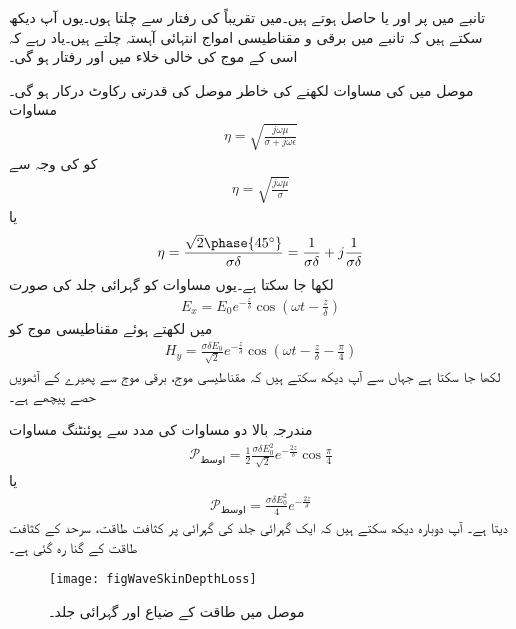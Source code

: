 تانبے میں  پر  اور  یا  حاصل ہوتے ہیں۔میں تقریباً  کی رفتار سے چلتا ہوں۔یوں آپ دیکھ سکتے ہیں کہ تانبے میں برقی و مقناطیسی امواج انتہائی آہستہ چلتے ہیں۔یاد رہے کہ اسی  کے موج کی خالی خلاء میں  اور  رفتار  ہو گی۔

موصل میں  کی مساوات لکھنے کی خاطر موصل کی قدرتی رکاوٹ درکار ہو گی۔مساوات 
\begin{align*}
\eta =\sqrt{\frac{j \omega \mu}{\sigma +j \omega \epsilon}}
\end{align*}
کو  کی وجہ سے
\begin{align*}
\eta=\sqrt{\frac{j\omega\mu}{\sigma}}
\end{align*}
یا
\begin{align}\label{مساوات_موج_قدرتی_رکاوٹ_موصل_گہرائی_جلد_کے_ساتھ}
\eta=\frac{\sqrt{2}\phase{45^\circ}}{\sigma \delta}=\frac{1}{\sigma \delta}+j\frac{1}{\sigma \delta}
\end{align}
لکھا جا سکتا ہے۔یوں مساوات  کو گہرائی جلد کی صورت
\begin{align}
E_x=E_0 e^{-\frac{z}{\delta}} \cos \left(\omega t -\frac{z}{\delta}\right)
\end{align}
 میں لکھتے ہوئے مقناطیسی موج کو
\begin{align}
H_y=\frac{\sigma \delta E_0}{\sqrt{2}} e^{-\frac{z}{\delta}} \cos \left(\omega t-\frac{z}{\delta}-\frac{\pi}{4}\right)
\end{align}
لکھا جا سکتا ہے جہاں سے آپ دیکھ سکتے ہیں کہ مقناطیسی موج، برقی موج سے  پھیرے کے آٹھویں حصے پیچھے ہے۔

مندرجہ بالا دو مساوات کی مدد سے پوئنٹنگ مساوات
 \begin{align*}
\mathscr{P}_{\text{اوسط}}=\frac{1}{2} \frac{\sigma \delta E_0^2}{\sqrt{2}} e^{-\frac{2 z}{\delta}} \cos \frac{\pi}{4}
\end{align*}
یا
\begin{align*}
\mathscr{P}_{\text{اوسط}}=\frac{\sigma \delta E_0^2}{4} e^{-\frac{2 z}{\delta}}
\end{align*}
دیتا ہے۔ آپ دوبارہ دیکھ سکتے ہیں کہ ایک گہرائی جلد کی گہرائی پر کثافت طاقت، سرحد کے کثافت طاقت کے  گنا رہ گئی ہے۔

\begin{figure}
\centering
\texttt{[image: figWaveSkinDepthLoss]}
\caption{موصل میں طاقت کے ضیاع اور گہرائی جلد۔}
\label{شکل_موج_گہرائی_جلد_اور_طاقتی_ضیاع}
\end{figure}

